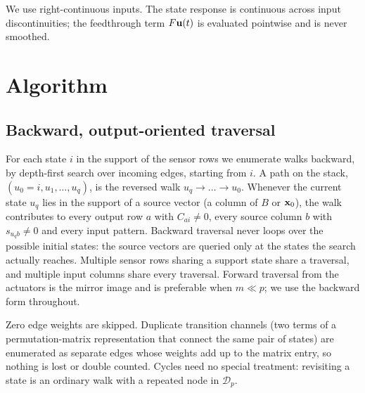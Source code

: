 \documentclass[aps,pra,superscriptaddress,floatfix,longbibliography,twocolumn]{revtex4-2}
\newcommand{\bx}{{\bf x}}
\newcommand{\bu}{{\bf u}}
\begin{document}
We use right-continuous inputs. The state response is continuous across input discontinuities; the feedthrough term $F\bu(t)$ is evaluated pointwise and is never smoothed.

\section{Algorithm}\label{sec:algorithm}

\subsection{Backward, output-oriented traversal}
For each state $i$ in the support of the sensor rows we enumerate walks backward, by depth-first search over incoming edges, starting from $i$. A path on the stack, $(u_0=i,u_1,\dots,u_q)$, is the reversed walk $u_q\to\dots\to u_0$. Whenever the current state $u_q$ lies in the support of a source vector (a column of $B$ or $\bx_0$), the walk contributes to every output row $a$ with $C_{ai}\ne0$, every source column $b$ with $s_{u_q b}\neq0$ and every input pattern. Backward traversal never loops over the possible initial states: the source vectors are queried only at the states the search actually reaches. Multiple sensor rows sharing a support state share a traversal, and multiple input columns share every traversal. Forward traversal from the actuators is the mirror image and is preferable when $m\ll p$; we use the backward form throughout.

Zero edge weights are skipped. Duplicate transition channels (two terms of a permutation-matrix representation that connect the same pair of states) are enumerated as separate edges whose weights add up to the matrix entry, so nothing is lost or double counted. Cycles need no special treatment: revisiting a state is an ordinary walk with a repeated node in $\mathcal{D}_p$.
\end{document}
